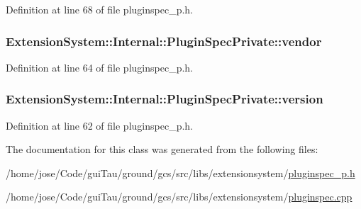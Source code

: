 Definition at line 68 of file pluginspec\-\_\-p.\-h.

\hypertarget{class_extension_system_1_1_internal_1_1_plugin_spec_private_a3628c7ebcd80e71dd74fc0df729aac7a}{
\subsubsection[{vendor}]{ Extension\-System\-::\-Internal\-::\-Plugin\-Spec\-Private\-::vendor}}\label{class_extension_system_1_1_internal_1_1_plugin_spec_private_a3628c7ebcd80e71dd74fc0df729aac7a}


Definition at line 64 of file pluginspec\-\_\-p.\-h.

\hypertarget{class_extension_system_1_1_internal_1_1_plugin_spec_private_a00cf7a310301d427a56b1b23576289bc}{
\subsubsection[{version}]{ Extension\-System\-::\-Internal\-::\-Plugin\-Spec\-Private\-::version}}\label{class_extension_system_1_1_internal_1_1_plugin_spec_private_a00cf7a310301d427a56b1b23576289bc}


Definition at line 62 of file pluginspec\-\_\-p.\-h.



The documentation for this class was generated from the following files\-:\begin{DoxyCompactItemize}
\item 
/home/jose/\-Code/gui\-Tau/ground/gcs/src/libs/extensionsystem/\hyperlink{pluginspec__p_8h}{pluginspec\-\_\-p.\-h}\item 
/home/jose/\-Code/gui\-Tau/ground/gcs/src/libs/extensionsystem/\hyperlink{pluginspec_8cpp}{pluginspec.\-cpp}\end{DoxyCompactItemize}
